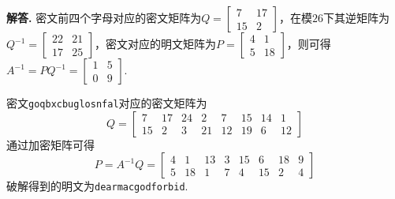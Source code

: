 \documentclass[12pt, a4paper, oneside]{ctexart}
\newenvironment{solution}{\par\noindent\textbf{解答. }}{\smallskip\par}
\def\add{\vspace{1ex}}      %
\begin{document}
\begin{solution}
    密文前四个字母对应的密文矩阵为$Q = \left[\begin{matrix}
        7&17\\
        15&2
    \end{matrix}\right]$，在模$26$下其逆矩阵为$Q^{-1} = \left[\begin{matrix}
        22&21\\
        17&25
    \end{matrix}\right]$，密文对应的明文矩阵为$P=\left[\begin{matrix}
        4&1\\
        5&18
    \end{matrix}\right]$，则可得$A^{-1} = PQ^{-1} = \left[\begin{matrix}
        1&5\\
        0&9
    \end{matrix}\right]$.\add

    密文\texttt{goqbxcbuglosnfal}对应的密文矩阵为
    \begin{equation*}
        Q = \left[\begin{matrix}
            7& 17& 24&  2&  7& 15& 14&  1\\
            15&  2&  3& 21& 12& 19&  6& 12
        \end{matrix}\right]
    \end{equation*}
    通过加密矩阵可得\begin{equation*}
        P = A^{-1}Q = \left[\begin{matrix}
            4&  1& 13&  3& 15&  6& 18&  9\\
            5& 18&  1&  7&  4& 15&  2&  4
        \end{matrix}\right]
    \end{equation*}
    破解得到的明文为\texttt{dearmacgodforbid}.
\end{solution}

\iffalse
\centerline{
    \texttt{[image: figure.png]}
}
\renewcommand\arraystretch{0.8} %
\begin{table}[!htbp] %
    \centering %
    \begin{tabular}{p{1cm}<{\centering}p{1cm}<{\centering}p{3cm}<{\centering}p{5cm}<{\centering}} %
        \toprule
        $x_i$ & $f[x_1]$ & $f[x_i,x_{i+1}]$ & $f[x_i,x_{i+1},x_{i+2}]$ \\
        \midrule
        $x_0$ & $f(x_0)$ &                  &                          \\
        $x_0$ & $f(x_0)$ & $f'(x_0)$        &                          \\
        $x_0$ & $f(x_1)$ & $\frac{f(x_1)-f(x_0)}{x_1-x_0}$ & $\frac{f(x_1)-f(x_0)}{(x_1-x_0)^2}-\frac{f'(x_0)}{x_1-x_0}$\\
        \bottomrule
    \end{tabular}
\end{table}

\def\Log{\text{Log}} %
$\Log$ %
\fi
\end{document}
